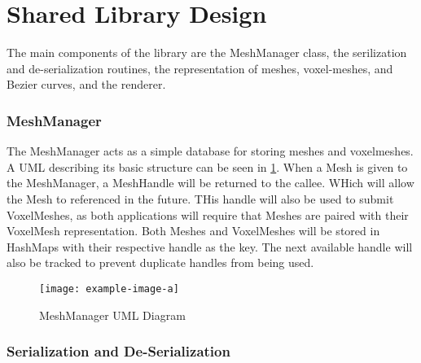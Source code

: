 \section{Shared Library Design} \label{SharedLibrary}


The main components of the library are the MeshManager class, the serilization and 
de-serialization routines, the representation of meshes, voxel-meshes, and Bezier curves, and the
renderer.


\subsubsection{MeshManager}
The MeshManager acts as a simple database for storing meshes and voxelmeshes. A UML describing its
basic structure can be seen in \ref{fig:MeshManagerUML}. When a Mesh is given to the MeshManager, a
MeshHandle will be returned to the callee. WHich will allow the Mesh to referenced in the future.
THis handle will also be used to submit VoxelMeshes, as both applications will require that Meshes 
are paired with their VoxelMesh representation. Both Meshes and VoxelMeshes will be stored in 
HashMaps with their respective handle as the key. The next available handle will also be tracked
to prevent duplicate handles from being used.

\begin{figure}[h]
  \centering
  \texttt{[image: example-image-a]}
  \caption{MeshManager UML Diagram}
  \label{fig:MeshManagerUML}
\end{figure}

\subsubsection{Serialization and De-Serialization}

